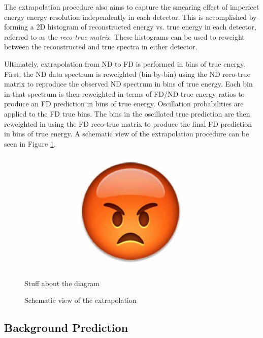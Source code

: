 The extrapolation procedure also aims to capture the smearing effect of
imperfect energy energy resolution independently in each detector.
This is accomplished by forming a 2D histogram of reconstructed energy
vs. true energy in each detector, referred to as the \textit{reco-true matrix}.
These histograms can be used to reweight between the reconstructed
and true spectra in either detector.

Ultimately, extrapolation from ND to FD is performed in bins of true energy.
First, the ND data spectrum is reweighted (bin-by-bin)
using the ND reco-true matrix
to reproduce the observed ND spectrum in bins of true energy.
Each bin in that spectrum is then reweighted in terms of FD/ND true energy
ratios to
produce an FD prediction in bins of true energy.
Oscillation probabilities are applied to the FD true bins.
The bins in the
oscillated true prediction are then reweighted in using the FD reco-true
matrix to produce the final FD prediction in bins of true energy.
A schematic view of the extrapolation procedure can be seen in Figure
\ref{extrap_fig}.

\begin{figure}
\begin{center}
  \begin{subfigure}[b]{0.45\textwidth}
    \centering
    \includegraphics[width=\textwidth]{figures/dummy/dummy}
  \end{subfigure}

\end{center}
\caption{Schematic view of the extrapolation}{
Stuff about the diagram
}
\label{extrap_fig}
\end{figure}

\subsection{Background Prediction}

